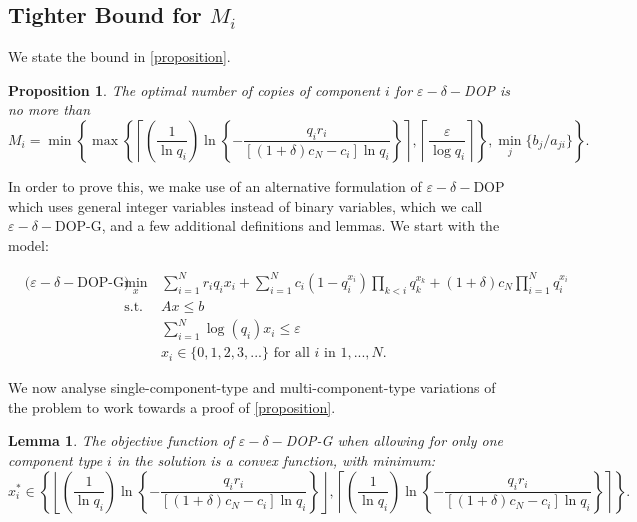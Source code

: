 \documentclass[11pt,authoryear,a4paper]{article}
\newcommand{\llceil}{\left\lceil}
\newcommand{\rrceil}{\right\rceil}
\newcommand{\llfloor}{\left\lfloor}
\newcommand{\rrfloor}{\right\rfloor}
\newtheorem{lemma}{Lemma}
\newtheorem{proposition}{Proposition}
\theoremstyle{definition}
\begin{document}
\subsection{Tighter Bound for $M_i$}
\label{sec:supp3:bound}

We state the bound in \autoref{proposition}.
\begin{proposition} \label{proposition}
    The optimal number of copies of component $i$ for $\varepsilon-\delta-$DOP is no more than 
    $$M_i = \min\left\{\max\left\{\llceil\left(\frac{1}{\ln q_i}\right)\ln\left\{-\frac{q_ir_i}{[(1+\delta)c_N - c_i]\ln q_i}\right\}\rrceil, \left\lceil\frac{\varepsilon}{\log q_i}\right\rceil\right\}, \min_j\{b_j/a_{ji}\}\right\}.$$
\end{proposition}

In order to prove this, we make use of an alternative formulation of $\varepsilon-\delta-$DOP which uses general integer variables instead of binary variables, which we call $\varepsilon-\delta-$DOP-G, and a few additional definitions and lemmas. We start with the model:

\begin{align}
    &\text{($\varepsilon-\delta-$DOP-G)}& \min_x\,&\sum_{i=1}^N r_iq_ix_i + \sum_{i=1}^Nc_i(1 - q_i^{x_i})\prod_{k<i}q_k^{x_k} + (1+\delta)c_N\prod_{i=1}^N q_i^{x_i}\label{e-DOP-G-obj}\\
    &&\text{s.t. } &Ax\leq b \label{e-DOP-G-knapsack}\\
    &&&\sum_{i=1}^N \log(q_i)x_i \leq \varepsilon \label{e-DOP-G-epsilon}\\
    &&&x_i \in \{0,1,2,3,...\} \text{ for all $i$ in $1,...,N$} \label{e-DOP-G-int}.
\end{align}

We now analyse single-component-type and multi-component-type variations of the problem to work towards a proof of \autoref{proposition}.

\begin{lemma}
\label{lemma:convex}
    The objective function of $\varepsilon-\delta-$DOP-G when allowing for only one component type $i$ in the solution is a convex function, with minimum: 
    $$x_i^* \in \left\{ \llfloor\left(\frac{1}{\ln q_i}\right)\ln\left\{-\frac{q_ir_i}{[(1+\delta)c_N - c_i]\ln q_i}\right\}\rrfloor, \llceil\left(\frac{1}{\ln q_i}\right)\ln\left\{-\frac{q_ir_i}{[(1+\delta)c_N - c_i]\ln q_i}\right\}\rrceil\right\}.$$
\end{lemma}
\end{document}
